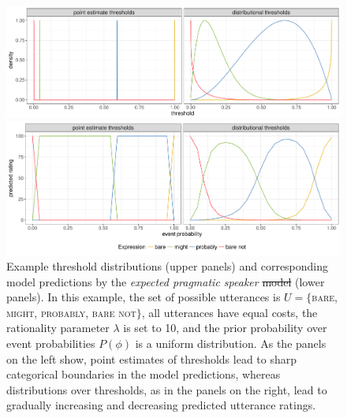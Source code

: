 \documentclass[man, floatsintext]{apa6}
\providecommand{\DIFadd}[1]{{\protect\color{blue}\uwave{#1}}} %
\providecommand{\DIFdel}[1]{{\protect\color{red}\sout{#1}}}                      %
\providecommand{\DIFaddFL}[1]{\DIFadd{#1}} %
\providecommand{\DIFdelFL}[1]{\DIFdel{#1}} %
\providecommand{\DIFaddbeginFL}{} %
\providecommand{\DIFaddendFL}{} %
\providecommand{\DIFdelbeginFL}{} %
\providecommand{\DIFdelendFL}{} %
\newcommand{\DIFscaledelfig}{0.5}
\newlength{\DIFdelgraphicswidth} %
\newlength{\DIFdelgraphicsheight} %
\newcommand{\DIFaddincludegraphics}[2][]{{\color{blue}\fbox{\DIFOincludegraphics[#1]{#2}}}} %
\newcommand{\DIFdelincludegraphics}[2][]{%
\sbox{\DIFdelgraphicsbox}{\DIFOincludegraphics[#1]{#2}}%
\settoboxwidth{\DIFdelgraphicswidth}{\DIFdelgraphicsbox} %
\settoboxtotalheight{\DIFdelgraphicsheight}{\DIFdelgraphicsbox} %
\scalebox{\DIFscaledelfig}{%
\parbox[b]{\DIFdelgraphicswidth}{\usebox{\DIFdelgraphicsbox}\\[-\baselineskip] \rule{\DIFdelgraphicswidth}{0em}}\llap{\resizebox{\DIFdelgraphicswidth}{\DIFdelgraphicsheight}{%
\setlength{\unitlength}{\DIFdelgraphicswidth}%
\begin{picture}(1,1)%
\thicklines\linethickness{2pt} %
{\color[rgb]{1,0,0}\put(0,0){\framebox(1,1){}}}%
{\color[rgb]{1,0,0}\put(0,0){\line( 1,1){1}}}%
{\color[rgb]{1,0,0}\put(0,1){\line(1,-1){1}}}%
\end{picture}%
}\hspace*{3pt}}} %
} %
\DeclareRobustCommand{\DIFaddbeginFL}{\DIFOaddbeginFL \let\includegraphics\DIFaddincludegraphics} %
\DeclareRobustCommand{\DIFaddendFL}{\DIFOaddendFL \let\includegraphics\DIFOincludegraphics} %
\DeclareRobustCommand{\DIFdelbeginFL}{\DIFOdelbeginFL \let\includegraphics\DIFdelincludegraphics} %
\DeclareRobustCommand{\DIFdelendFL}{\DIFOaddendFL \let\includegraphics\DIFOincludegraphics} %
\begin{document}
\begin{figure}[th!]
\includegraphics[width=\textwidth]{plots/model-visualization-distributions.pdf}

\includegraphics[width=\textwidth]{plots/model-visualization-predictions.pdf}

\caption{Example threshold distributions (upper panels) and corresponding model predictions by the \textit{expected pragmatic speaker} \DIFdelbeginFL \DIFdelFL{model }\DIFdelendFL \DIFaddbeginFL \DIFaddFL{agent }\DIFaddendFL (lower panels). In this example, the set of possible utterances is $U=\{$\textsc{bare}, \textsc{might}, \textsc{probably}, \textsc{bare not}$\}$, all utterances have equal costs, the rationality parameter $\lambda$ is set to 10, and the prior probability over event probabilities $P(\phi)$ is a uniform distribution. As the panels on the left show, point estimates of thresholds lead to sharp categorical boundaries in the model predictions, whereas distributions over thresholds, as in the panels on the right, lead to gradually increasing and decreasing predicted utterance ratings. \label{fig:model-visualization}}
\end{figure}
\end{document}
